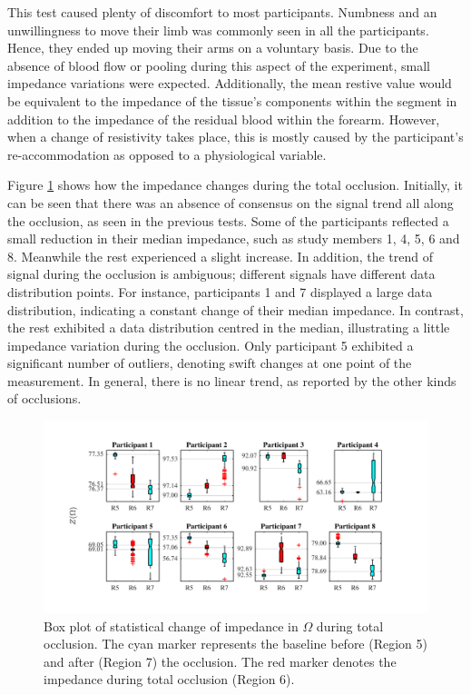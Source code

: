 This test caused plenty of discomfort to most participants. Numbness and an unwillingness to move their limb was commonly seen in all the participants. Hence, they ended up moving their arms on a voluntary basis. Due to the absence of blood flow or pooling during this aspect of the experiment, small impedance variations were expected. Additionally, the mean restive value would be equivalent to the impedance of the tissue's components within the segment in addition to the impedance of the residual blood within the forearm. However, when a change of resistivity takes place, this is mostly caused by the participant's re-accommodation as opposed to a physiological variable. 

Figure \ref{fig:total arterial statistics impedance} shows how the impedance changes during the total occlusion. Initially, it can be seen that there was an absence of consensus on the signal trend all along the occlusion, as seen in the previous tests.  Some of the participants reflected a small reduction in their median impedance, such as study members 1, 4, 5, 6 and 8. Meanwhile the rest experienced a slight increase. In addition, the trend of signal during the occlusion is ambiguous; different signals have different data distribution points. For instance, participants 1 and 7 displayed a large data distribution, indicating a constant change of their median impedance. In contrast, the rest exhibited a data distribution centred in the median, illustrating a little impedance variation during the occlusion. Only participant 5 exhibited a significant number of outliers, denoting swift changes at one point of the measurement. In general, there is no linear trend, as reported by the other kinds of occlusions. 

\begin{figure}[!hpb]
	\centering
	\includegraphics[width=15cm,keepaspectratio]{figure_vop_7}    
	\caption[Change of impedance during total occlusion]{Box plot of statistical change of impedance in $\Omega$ during total occlusion. The cyan marker represents the baseline before (Region 5) and after (Region 7) the occlusion. The red marker denotes the impedance during total occlusion (Region 6).}
	\label{fig:total arterial statistics impedance}
\end{figure} 

